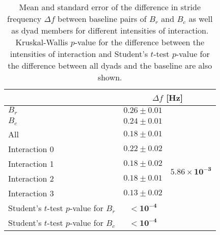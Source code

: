\begin{table}
\centering
\caption{Mean and standard error of the difference in stride frequency $\Delta f$ between baseline pairs of $B_r$ and $B_c$ as well as dyad members for different intensities of interaction. Kruskal-Wallis $p$-value for the difference between the intensities of interaction and Student's $t$-test $p$-value for the difference between all dyads and the baseline are also shown.}
\label{tab:delta_f}
\begin{tabular}{lcc}
\toprule
& \multicolumn{2}{c}{$\Delta f$ [Hz]}  \\
\midrule
$B_r$ &$0.26 \pm 0.01$ & \\
$B_c$ &$0.24 \pm 0.01$ & \\
\midrule
All & $0.18 \pm 0.01$ & \\
\midrule
Interaction 0 &$0.22 \pm 0.02$  & \multirow{4}{*}{$\mathbf{5.86 \times 10^{-3}}$} \\
Interaction 1 &$0.18 \pm 0.02$ & \\
Interaction 2 &$0.18 \pm 0.01$ & \\
Interaction 3 &$0.13 \pm 0.02$ & \\
\midrule
Student's $t$-test $p$-value for $B_r$ & $\mathbf{< 10^{-4}}$ \\Student's $t$-test $p$-value for $B_c$ & $\mathbf{< 10^{-4}}$ \\\bottomrule
\end{tabular}
\end{table}

